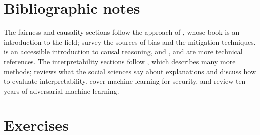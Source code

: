 \section*{Bibliographic notes}

The fairness and causality sections follow the approach of \citet{barocas2023fairness}, whose book is an introduction to the field; \citet{mehrabi2021survey} survey the sources of bias and the mitigation
techniques. \citet{pearl2018book} is an accessible introduction to causal reasoning, and
\citet{pearl2009causality}, \citet{peters2017elements} and \citet{hernan2020causal} are more technical
references. The interpretability sections follow \citet{molnar2022interpretable}, which describes many more
methods; \citet{miller2019explanation} reviews what the social sciences say about explanations and
\citet{doshivelez2017towards} discuss how to evaluate interpretability. \citet{chio2018machine} cover machine
learning for security, and \citet{biggio2018wild} review ten years of adversarial machine learning.

\section*{Exercises}

